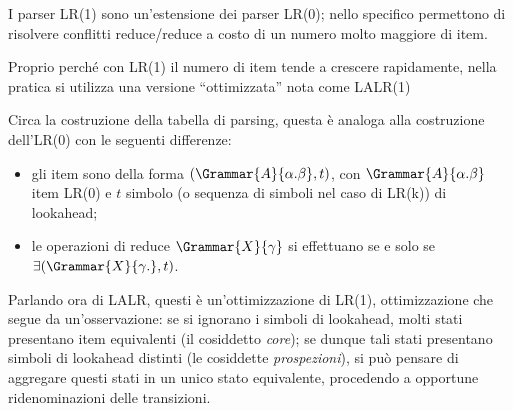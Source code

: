 \documentclass{subfiles}
\begin{document}
I parser LR(1) sono un'estensione dei parser LR(0); nello specifico permettono di risolvere conflitti reduce/reduce a costo di un numero molto maggiore di item.

\begin{Remark*}
    Proprio perché con LR(1) il numero di item tende a crescere rapidamente, nella pratica si utilizza una versione ``ottimizzata'' nota come LALR(1)
\end{Remark*}

Circa la costruzione della tabella di parsing, questa è analoga alla costruzione dell'LR(0) con le seguenti differenze:
\begin{itemize}
    \item gli item sono della forma \((\Grammar{A}{\alpha . \beta}, t)\),
          con \(\Grammar{A}{\alpha . \beta}\) item LR(0) e \(t\) simbolo (o sequenza di simboli nel caso di LR(k)) di lookahead;

    \item le operazioni di reduce \(\Grammar{X}{\gamma}\) si effettuano se e solo se \(\exists (\Grammar{X}{\gamma.}, t)\).
\end{itemize}

Parlando ora di LALR, questi è un'ottimizzazione di LR(1), ottimizzazione che segue da un'osservazione: se si ignorano i simboli di lookahead,
molti stati presentano item equivalenti (il cosiddetto \emph{core}); se dunque tali stati presentano simboli di lookahead distinti (le cosiddette \emph{prospezioni}),
si può pensare di aggregare questi stati in un unico stato equivalente, procedendo a opportune ridenominazioni delle transizioni.
\end{document}
